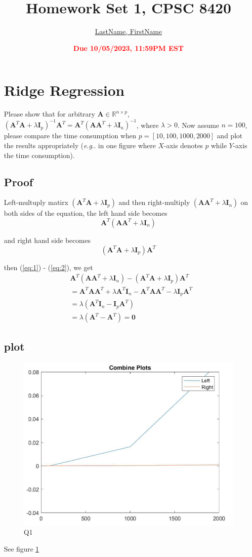 \documentclass[11pt]{article}
\title{{\bf Homework Set 1, CPSC 8420}}
\author{\Large\underline{LastName, FirstName}}
\date{\textbf{\Large\textcolor{red}{Due 10/05/2023, 11:59PM EST}}}
\makeatletter
\newcommand{\R}{\mathbb{R}}
\newcommand{\minimize}{\operatorname*{minimize\ }}
\newcommand{\mtx}[1]{\mathbf{#1}}
\newcommand{\vct}[1]{\mathbf{#1}}
\def \mA {\mtx{A}}
\def \mI {\mtx{I}}
\def \mU {\mtx{U}}
\def \mX {\mtx{X}}
\def \vv {\vct{v}}
\def \R {\mathbb{R}}
\DeclareRobustCommand\onedot{\futurelet\@let@token\@onedot}
\def\@onedot{\ifx\@let@token.\else.\null\fi\xspace}
\def\eg{\emph{e.g}\onedot} \def\Eg{\emph{E.g}\onedot}
\makeatother
\begin{document}
\maketitle

\section{Ridge Regression}
Please show that for arbitrary $\mA\in\R^{n\times p}$, $(\mA^T\mA+\lambda\mI_p)^{-1}\mA^T=\mA^T(\mA\mA^T+\lambda\mI_n)^{-1}$, where $\lambda>0$. Now assume $n=100$, please compare the time consumption when $p=[10,100,1000,2000]$ and plot the results appropriately (\eg in one figure where $X$-axis denotes $p$ while $Y$-axis the time consumption).

\subsection{Proof}
Left-multuply matirx $(\mA^T\mA+\lambda\mI_p)$ and then right-multiply $(\mA\mA^T+\lambda\mI_n)$ on both sides of the equation,
the left hand side becomes 
\begin{equation}
	\mA^T(\mA\mA^T+\lambda\mI_n)\label{eq:1}
\end{equation}

and right hand side becomes
\begin{equation}
	(\mA^T\mA+\lambda\mI_p)\mA^T\label{eq:2}
\end{equation}

then (\ref{eq:1}) - (\ref{eq:2}), we get 
\begin{align*}
	& \mA^T(\mA\mA^T+\lambda\mI_n) - (\mA^T\mA+\lambda\mI_p)\mA^T\\
	& = \mA^T\mA\mA^T+\lambda\mA^T\mI_n - \mA^T\mA\mA^T-\lambda\mI_p\mA^T\\
	& = \lambda(\mA^T\mI_n - \mI_p\mA^T)\\
	& = \lambda(\mA^T - \mA^T) = \mtx{0}
\end{align*}

\subsection{plot}
\begin{figure}[h!]
	\centering
	\includegraphics[width=0.5\linewidth]{Q1.png}
	\caption{Q1}
	\label{fig:Q1}
\end{figure}
See figure \ref{fig:Q1}
\end{document}
